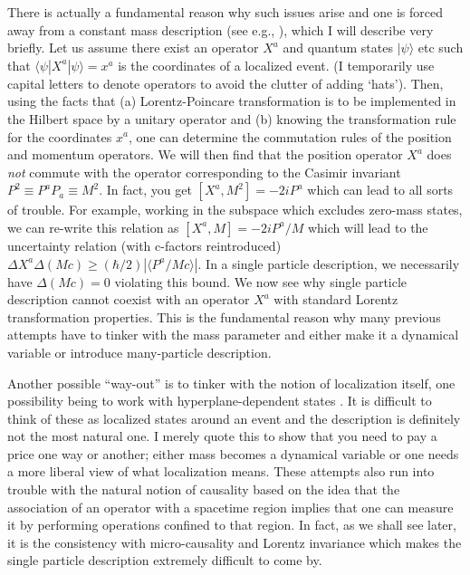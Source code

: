 \documentclass{article}
\def\ket#1{|#1\rangle}                    %
\def\bk#1#2#3{{\langle #1|#2|#3\rangle}}  %
\begin{document}
There is actually a fundamental reason why such issues arise and one is forced away from a constant mass description (see e.g., \cite{fb}), which I will describe very briefly. Let us assume there exist an operator $X^a$ and quantum states $\ket{\psi}$ etc such that $\bk{\psi}{X^a}{\psi}=x^a$ is the coordinates of a localized event. (I temporarily use capital letters to denote operators to avoid the clutter of adding `hats'). Then, using the facts that (a) Lorentz-Poincare transformation is to be implemented in the Hilbert space by a unitary operator and (b) knowing the transformation rule for the coordinates $x^a$, one can determine the commutation rules of the position and momentum operators. We will then find that the position operator $X^a$ does \textit{not} commute with the operator corresponding to the Casimir invariant $P^2\equiv P^aP_a\equiv M^2$. In fact, you get $[X^a,M^2]=-2iP^a$ which can lead to all sorts of trouble. For example, working in the subspace which excludes zero-mass states, we can re-write this relation as $[X^a,M]=-2iP^a/M$ which will lead to the uncertainty relation (with c-factors reintroduced)
$\Delta X^a \Delta (Mc)\geq (\hbar/2)|\langle P^a/Mc\rangle|$. In a single particle description, we necessarily have $\Delta (Mc)=0$ violating this bound. We now see why single particle description cannot coexist with an operator $X^a$ with standard Lorentz transformation properties. This is the fundamental reason why many previous attempts have to tinker with the mass parameter and either make it a dynamical variable or introduce many-particle description.

Another possible ``way-out'' is to tinker with the notion of localization itself, one possibility being to work with hyperplane-dependent states \cite{fb}. It is difficult to think of these as localized states around an event and the description is definitely not the most natural one. I merely quote this to show that you need to pay a price one way or another; either mass becomes a dynamical variable or one needs a more liberal view of what localization means. These attempts also run into trouble \cite{malament} with the natural notion of causality based on the idea that 
the association of an
operator with a spacetime region implies that one can measure it by
performing operations confined to that region. In fact, as we shall see later, it is the consistency with micro-causality and Lorentz invariance which makes the single particle description extremely difficult to come by.
\end{document}
